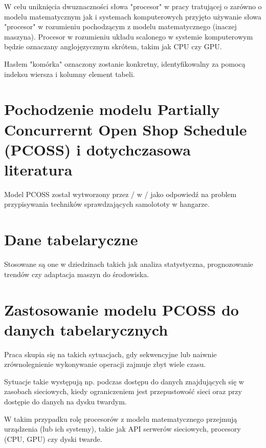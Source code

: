 \documentclass[brudnopis]{xmgr}
\begin{document}
W celu uniknięcia dwuznaczności słowa "procesor" w pracy tratującej o zarówno o modelu matematycznym jak i systemach komputerowych przyjęto używanie słowa "procesor" w rozumieniu pochodzącym z modelu matematycznego (inaczej maszyna).
Procesor w rozumieniu układu scalonego w systemie komputerowym będzie oznaczany anglojęzycznym skrótem, takim jak CPU czy GPU.

Hasłem "komórka" oznaczony zostanie konkretny, identyfikowalny za pomocą indeksu wiersza i kolumny element tabeli.

\chapter{Pochodzenie modelu Partially Concurrernt Open Shop Schedule (PCOSS) i dotychczasowa literatura}

Model PCOSS został wytworzony przez / w / jako odpowiedź na problem przypisywania techników sprawdzających samolototy w hangarze.

\chapter{Dane tabelaryczne}

Stosowane są one w dziedzinach takich jak analiza statystyczna, prognozowanie trendów czy adaptacja maszyn do środowiska.


\chapter{Zastosowanie modelu PCOSS do danych tabelarycznych}

Praca skupia się na takich sytuacjach, gdy sekwencyjne lub naiwnie zrównolegnienie wykonywanie operacji zajmuje zbyt wiele czasu.

Sytuacje takie występują np. podczas dostępu do danych znajdujących się w zasobach sieciowych, kiedy ograniczeniem jest przepustowość sieci oraz przy dostępie do danych na dysku twardym.


W takim przypadku rolę procesorów z modelu matematycznego przejmują urządzenia (lub ich systemy), takie jak API serwerów sieciowych, procesory (CPU, GPU) czy dyski twarde.
\end{document}
